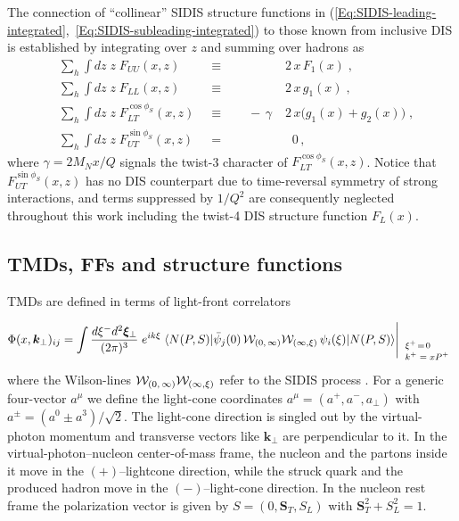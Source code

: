 \documentclass[a4paper,11pt]{article}
\newcommand{\red}[1]{{\color{red} #1}}
\newcommand{\be}{\begin{equation}}
\newcommand{\ee}{\end{equation}}
\newcommand{\la}{\langle}
\newcommand{\ra}{\rangle}
\newcommand{\with}[3]{{\Biggl|{\renewcommand*{\arraystretch}{0.8}
	\begin{array}{l} 
	\phantom{X}\\
	\mbox{\scriptsize ${#1}$}\\
	\mbox{\scriptsize ${#2}$}\\
	\mbox{\scriptsize #3}\end{array}}}}
\newcommand{\AP}[1]{\red{#1}}
\def\bfkperp{{\bm k}_\perp}
\begin{document}
The connection of ``collinear'' SIDIS structure functions
in (\ref{Eq:SIDIS-leading-integrated},~\ref{Eq:SIDIS-subleading-integrated})
to those known from inclusive DIS is established by integrating over $z$
and summing over hadrons as 
\begin{subequations}\begin{alignat}{4}
	&\sum\limits_h\int d z\;z\;F_{UU}(x,z) 
	&\equiv	&&	& 2\,x\,F_1(x) \;, 
	\label{Eq:DIS-F1}\\ %
	&\sum\limits_h\int d z\;z\;F_{LL}(x,z) 
	&\equiv && 	& 2\,x\,g_1(x) \;, 
	\label{Eq:DIS-g1}\\ %
	&\sum\limits_h\int d z\;z\;F_{LT}^{\cos\phi_S}(x,z) \;\;
	&\equiv && \;\; -\,\gamma\; & 2\,x\biggl(g_1(x)+g_2(x)\biggr) \;, 
	\label{Eq:DIS-gT}\\ %
	&\sum\limits_h\int d z\;z\;F_{UT}^{\sin\phi_S}(x,z) 
	&=      && 	    & \;\; 0 \, ,
	\label{Eq:DIS-zero}
\end{alignat}\end{subequations}
where $\gamma=2M_Nx/Q$ signals the twist-3 character of $F_{LT}^{\cos\phi_S}(x,z)$.
Notice that $F_{UT}^{\sin\phi_S}(x,z)$ has no DIS counterpart due to time-reversal
symmetry of strong interactions, and terms suppressed by $1/Q^2$ are 
consequently neglected throughout this work including the twist-4 DIS 
structure function $F_L(x)$.


\subsection{TMDs, FFs and structure functions}
\label{Sec-2.2:def-TMD-FF}

TMDs are defined in terms of light-front correlators
\be\label{Eq:correlator}
    	\Phi(x,\bfkperp)_{ij} = \int\frac{ d \xi^- d^2{\bm \xi}_\perp}{(2\pi)^3}
	\;e^{ik\xi}\;\la N(P,S)|\bar\psi_j(0)\,{\cal W}_{(0,\,\infty)}
	{\cal W}_{(\infty,\xi)}\,\psi_i(\xi)|N(P,S)\ra
    	\with{ }{\xi^+\!=\!0}{$k^+ = xP^+$}
	\ee
where the Wilson-lines \AP{${\cal W}_{(0,\,\infty)}
	{\cal W}_{(\infty,\xi)}$} refer to the SIDIS process 
\cite{Collins:2002kn}. For a generic four-vector $a^\mu$ we define
the light-cone coordinates $a^\mu=(a^+,a^-,a_\perp)$ with 
$a^\pm=(a^0\pm a^3)/\sqrt{2}$. 
The light-cone direction is singled out by the virtual-photon momentum 
and transverse vectors like $\bfkperp$ are perpendicular to it. In the
virtual-photon--nucleon center-of-mass frame, the nucleon and the partons 
inside it move in the $(+)$--lightcone direction, while the struck 
quark and the produced hadron move in the $(-)$--light-cone direction.
In the nucleon rest frame the polarization vector is given by 
$S=(0,{\bm S}_T,S_L)$ with ${\bm S}_T^2+S_L^2=1$.
\end{document}
